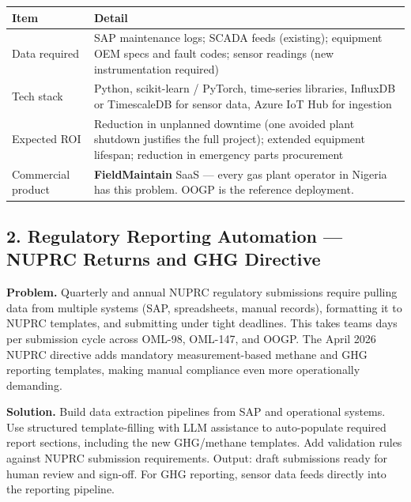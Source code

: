 \documentclass[10pt]{article}
\newcommand{\spacer}{\vspace{10pt}}
\newcommand{\bigspacer}{\vspace{16pt}}
\begin{document}
\spacer
\small
\begin{tabularx}{\columnwidth}{@{}lX@{}}
\toprule
\textbf{Item} & \textbf{Detail} \\
\midrule
Data required     & SAP maintenance logs; SCADA feeds (existing); equipment OEM
                    specs and fault codes; sensor readings (new instrumentation
                    required) \\
Tech stack        & Python, scikit-learn / PyTorch, time-series libraries,
                    InfluxDB or TimescaleDB for sensor data, Azure IoT Hub for
                    ingestion \\
Expected ROI      & Reduction in unplanned downtime (one avoided plant shutdown
                    justifies the full project); extended equipment lifespan;
                    reduction in emergency parts procurement \\
Commercial product & \textbf{FieldMaintain} SaaS --- every gas plant operator in
                    Nigeria has this problem. OOGP is the reference deployment. \\
\bottomrule
\end{tabularx}
\normalsize

\bigspacer

\subsection*{2. Regulatory Reporting Automation --- NUPRC Returns and GHG Directive}

\textbf{Problem.}
Quarterly and annual NUPRC regulatory submissions require pulling data from
multiple systems (SAP, spreadsheets, manual records), formatting it to NUPRC
templates, and submitting under tight deadlines. This takes teams days per
submission cycle across OML-98, OML-147, and OOGP. The April 2026 NUPRC
directive adds mandatory measurement-based methane and GHG reporting templates,
making manual compliance even more operationally demanding.

\textbf{Solution.}
Build data extraction pipelines from SAP and operational systems. Use
structured template-filling with LLM assistance to auto-populate required
report sections, including the new GHG/methane templates. Add validation rules
against NUPRC submission requirements. Output: draft submissions ready for
human review and sign-off. For GHG reporting, sensor data feeds directly into
the reporting pipeline.
\end{document}
